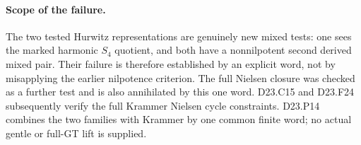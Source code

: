 \paragraph{Scope of the failure.}
The two tested Hurwitz representations are genuinely new mixed
tests: one sees the marked harmonic $S_4$ quotient, and both
have a nonnilpotent second derived mixed pair. Their failure is
therefore established by an explicit word, not by misapplying
the earlier nilpotence criterion. The full Nielsen closure was
checked as a further test and is also annihilated by this one
word. D23.C15 and D23.F24 subsequently verify the full Krammer
Nielsen cycle constraints. D23.P14 combines the two families
with Krammer by one common finite word; no actual gentle or
full-GT lift is supplied.
